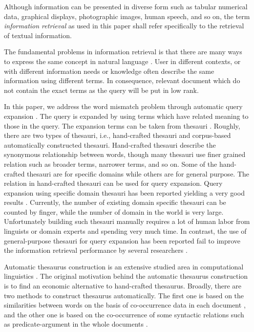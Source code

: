 Although information can be presented in diverse form such as  tabular numerical data, graphical displays, photographic images, human speech, and so on, the term {\it information retrieval} as used in this paper shall refer specifically to the retrieval of textual information. 

The fundamental problems in information retrieval is that  there are many ways to express the same concept in natural language \cite{blair85,grossman98}. User in different contexts, or with different information needs or knowledge often describe the same information using different terms. In consequence, relevant document which do not contain the exact terms as the query will be put in low rank.

In this paper, we address the word mismatch problem through automatic query expansion \cite{ekmekcioglu92}. The query is expanded by using terms which have related meaning to those in the query. The expansion terms can be taken from thesauri \cite{Aitchison87,paice91,kristensen93}. Roughly, there are two types of thesauri, i.e., hand-crafted thesauri and corpus-based automatically constructed thesauri. Hand-crafted thesauri describe the synonymous relationship between words, though many thesauri use finer grained relation such as broader terms, narrower terms, and so on.  Some of the hand-crafted thesauri are for specific domains while others are for general purpose. The relation in hand-crafted thesauri can be used for query expansion. Query expansion using specific domain thesauri has been reported yielding a very good results \cite{fox80,chen95}. Currently, the number of existing domain specific thesauri can be counted by finger, while the number of domain in the world is very large. Unfortunately building such thesauri manually requires a lot of human labor from linguists or domain experts and spending very much time.
In contrast, the use of general-purpose thesauri for query expansion has been reported fail to improve the information retrieval performance by several researchers \cite{richardson94,richardson95,voorhees94,voorhees98,smeaton96,stairmand97}.

Automatic thesaurus construction is an extensive studied area in computational linguistics \cite{charniak93,church89,hindle90,lin98}. The original motivation behind the automatic thesaurus construction is to find an economic alternative to hand-crafted thesaurus. Broadly, there are two methods to construct thesaurus automatically. The first one is based on the similarities between words on the basis of co-occurrence data in each document \cite{qiu93,schutze94,schutze97,crouch90,crouch92}, and the other one is based on the co-occurrence of some syntactic relations such as predicate-argument in the whole documents \cite{jing94,ruge92,grefenstette92,grefenstette94,hindle90}.

